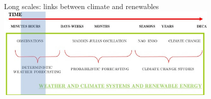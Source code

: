 \documentclass{beamer}%
\begin{document}
\begin{frame}{Long scales: links between climate and renewables}
\centering\includegraphics[width=0.8\textwidth]{timescales2.jpg}
\end{frame}


\end{document}

